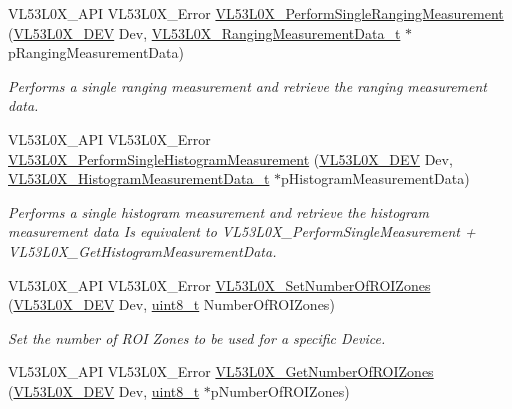 \begin{DoxyCompactItemize}
V\+L53\+L0\+X\+\_\+\+A\+PI V\+L53\+L0\+X\+\_\+\+Error \hyperlink{group__VL53L0X__measurement__group_gae81888494fb896a4a8922f16832291c1}{V\+L53\+L0\+X\+\_\+\+Perform\+Single\+Ranging\+Measurement} (\hyperlink{group__VL53L0X__platform__group_ga2d6405308b1dd524b462f1b8fb97d167}{V\+L53\+L0\+X\+\_\+\+D\+EV} Dev, \hyperlink{structVL53L0X__RangingMeasurementData__t}{V\+L53\+L0\+X\+\_\+\+Ranging\+Measurement\+Data\+\_\+t} $\ast$p\+Ranging\+Measurement\+Data)
\begin{DoxyCompactList}\small\item\em Performs a single ranging measurement and retrieve the ranging measurement data. \end{DoxyCompactList}\item 
V\+L53\+L0\+X\+\_\+\+A\+PI V\+L53\+L0\+X\+\_\+\+Error \hyperlink{group__VL53L0X__measurement__group_ga9607a687a23e621f2c7803374e34a5c5}{V\+L53\+L0\+X\+\_\+\+Perform\+Single\+Histogram\+Measurement} (\hyperlink{group__VL53L0X__platform__group_ga2d6405308b1dd524b462f1b8fb97d167}{V\+L53\+L0\+X\+\_\+\+D\+EV} Dev, \hyperlink{structVL53L0X__HistogramMeasurementData__t}{V\+L53\+L0\+X\+\_\+\+Histogram\+Measurement\+Data\+\_\+t} $\ast$p\+Histogram\+Measurement\+Data)
\begin{DoxyCompactList}\small\item\em Performs a single histogram measurement and retrieve the histogram measurement data Is equivalent to V\+L53\+L0\+X\+\_\+\+Perform\+Single\+Measurement + V\+L53\+L0\+X\+\_\+\+Get\+Histogram\+Measurement\+Data. \end{DoxyCompactList}\item 
V\+L53\+L0\+X\+\_\+\+A\+PI V\+L53\+L0\+X\+\_\+\+Error \hyperlink{group__VL53L0X__measurement__group_ga85c9be1dd8d1cb3b5ed70630e530b6d0}{V\+L53\+L0\+X\+\_\+\+Set\+Number\+Of\+R\+O\+I\+Zones} (\hyperlink{group__VL53L0X__platform__group_ga2d6405308b1dd524b462f1b8fb97d167}{V\+L53\+L0\+X\+\_\+\+D\+EV} Dev, \hyperlink{vl53l0x__types_8h_aba7bc1797add20fe3efdf37ced1182c5}{uint8\+\_\+t} Number\+Of\+R\+O\+I\+Zones)
\begin{DoxyCompactList}\small\item\em Set the number of R\+OI Zones to be used for a specific Device. \end{DoxyCompactList}\item 
V\+L53\+L0\+X\+\_\+\+A\+PI V\+L53\+L0\+X\+\_\+\+Error \hyperlink{group__VL53L0X__measurement__group_gad345958f05c6b130f35c569dd0d0e4f8}{V\+L53\+L0\+X\+\_\+\+Get\+Number\+Of\+R\+O\+I\+Zones} (\hyperlink{group__VL53L0X__platform__group_ga2d6405308b1dd524b462f1b8fb97d167}{V\+L53\+L0\+X\+\_\+\+D\+EV} Dev, \hyperlink{vl53l0x__types_8h_aba7bc1797add20fe3efdf37ced1182c5}{uint8\+\_\+t} $\ast$p\+Number\+Of\+R\+O\+I\+Zones)

\end{DoxyCompactItemize}
